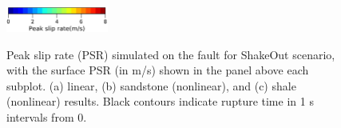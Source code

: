 
{}
\begin{figure}[!ht]
     \\[\baselineskip]%
     \\[\baselineskip]%
     \\[\baselineskip]%
    \vspace{-3mm}
    \centering
    \includegraphics[width=0.3\textwidth]{figures/figure_eks_1d.png}\label{fig:eks-1d}
    \caption{Peak slip rate (PSR) simulated on the fault for ShakeOut scenario, with the surface PSR (in m/s) shown in the panel above each subplot. (a) linear, (b) sandstone (nonlinear), and (c) shale (nonlinear) results. Black contours indicate rupture time in 1 s intervals from 0.}
    \label{fig:eks-1}
\end{figure}
\clearpage

